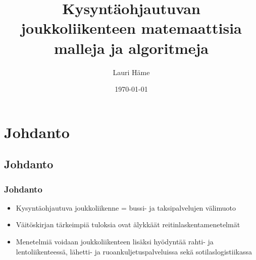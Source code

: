 \documentclass{beamer}
\title[Aalto-yliopiston perustieteiden korkeakoulu]{Kysyntäohjautuvan joukkoliikenteen matemaattisia malleja ja algoritmeja}
\author[L. Häme]{Lauri Häme}                 %
\institute[Aalto-yliopiston perustieteiden korkeakoulu]{Aalto-yliopiston perustieteiden korkeakoulu}      %
\date{\today}      %
\begin{document}
\begin{frame}
  \titlepage
\end{frame}

\section{Johdanto}

\subsection{Johdanto}
\begin{frame}
  \frametitle{Johdanto}   %
  \begin{itemize}
    \item 
Kysyntäohjautuva joukkoliikenne = bussi- ja taksipalvelujen välimuoto
\item
Väitöskirjan tärkeimpiä tuloksia ovat älykkäät reitinlaskentamenetelmät
\item
Menetelmiä voidaan joukkoliikenteen lisäksi hyödyntää
rahti- ja lentoliikenteessä, lähetti- ja ruoankuljetuspalveluissa sekä sotilaslogistiikassa
  \end{itemize}
\end{frame}
\end{document}
